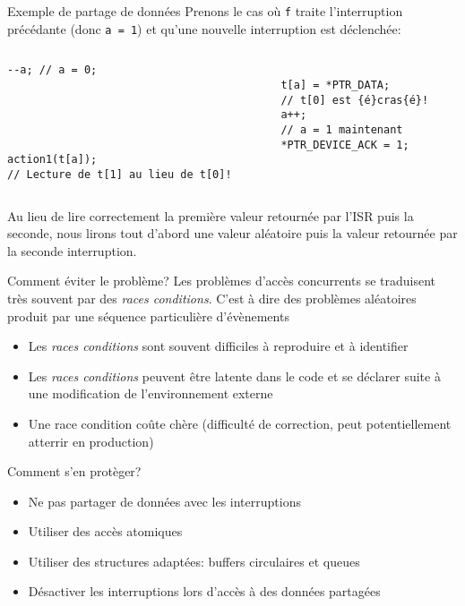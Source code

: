 \begin{frame}[fragile]{Exemple de partage de données}
  Prenons le  cas où  \verb+f+ traite l'interruption  précédante (donc
  \verb+a = 1+) et qu'une nouvelle interruption est déclenchée:
  \begin{columns}
    \begin{column}{5cm}
      \begin{lstlisting}[showlines=true,emptylines=10]
--a; // a = 0;





action1(t[a]);
// Lecture de t[1] au lieu de t[0]!
       \end{lstlisting}
     \end{column}
     \begin{column}{5cm}
      \begin{lstlisting}[showlines=true,emptylines=10,escapeinside=\{\}]

t[a] = *PTR_DATA;
// t[0] est {é}cras{é}!
a++;
// a = 1 maintenant
*PTR_DEVICE_ACK = 1;


       \end{lstlisting}
    \end{column}
  \end{columns}
  Au lieu de lire correctement  la première valeur retournée par l'ISR
  puis la seconde, nous lirons  tout d'abord une valeur aléatoire puis
  la valeur retournée par la seconde interruption.
\end{frame}

\begin{frame}{Comment éviter le problème?}
  Les problèmes d'accès concurrents se traduisent très souvent par des
  \emph{races  conditions}.   C'est à  dire  des problèmes  aléatoires
  produit par une séquence particulière d'évènements
  \begin{itemize}
  \item   Les  \emph{races  conditions}   sont  souvent   difficiles  à
    reproduire et à identifier
  \item Les  \emph{races conditions} peuvent être latente  dans le code
    et se déclarer suite à une modification de l'environnement externe
  \item Une race condition coûte chère (difficulté de correction, peut
    potentiellement atterrir en production)
  \end{itemize}
  Comment s'en protèger?
  \begin{itemize}
  \item  Ne  pas  partager de données avec les interruptions
  \item Utiliser des accès atomiques
  \item  Utiliser  des  structures  adaptées: buffers  circulaires  et
    queues
  \item  Désactiver  les  interruptions  lors  d'accès  à  des  données
    partagées
  \end{itemize}
\end{frame}

